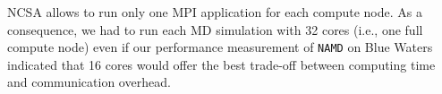 NCSA allows to run only one MPI application for each compute node. As a
consequence, we had to run each MD simulation with 32 cores (i.e., one full
compute node) even if our performance measurement of \texttt{NAMD} on Blue
Waters indicated that 16 cores would offer the best trade-off between
computing time and communication overhead.











